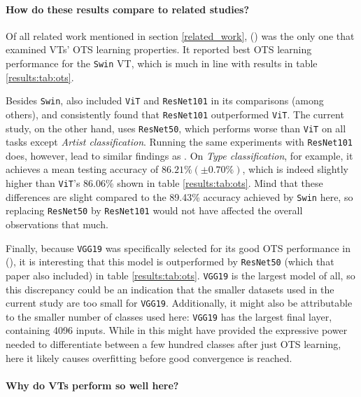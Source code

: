\paragraph{How do these results compare to related studies?}
Of all related work mentioned in section \ref{related_work}, \citeauthor{zhou2021convnets} (\citeyear{zhou2021convnets}) was the only one that examined VTs' OTS learning properties. It reported best OTS learning performance for the \texttt{Swin} VT, which is much in line with results in table \ref{results:tab:ots}.

Besides \texttt{Swin}, \citeauthor{zhou2021convnets} also included \texttt{ViT} and \texttt{ResNet101} in its comparisons (among others), and consistently found that \texttt{ResNet101} outperformed \texttt{ViT}. The current study, on the other hand, uses \texttt{ResNet50}, which performs worse than \texttt{ViT} on all tasks except \textit{Artist classification}. Running the same experiments with \texttt{ResNet101} does, however, lead to similar findings as \citeauthor{zhou2021convnets}. On \textit{Type classification}, for example, it achieves a mean testing accuracy of  $86.21\% (\pm 0.70\%)$, which is indeed slightly higher than \texttt{ViT}'s 86.06\% shown in table \ref{results:tab:ots}. Mind that these differences are slight compared to the 89.43\% accuracy achieved by \texttt{Swin} here, so replacing \texttt{ResNet50} by \texttt{ResNet101} would not have affected the overall observations that much.

Finally, because \texttt{VGG19} was specifically selected for its good OTS performance in \citeauthor{sabatelli2018deep} (\citeyear{sabatelli2018deep}), it is interesting that this model is outperformed by \texttt{ResNet50} (which that paper also included) in table \ref{results:tab:ots}. \texttt{VGG19} is the largest model of all, so this discrepancy could be an indication that the smaller datasets used in the current study are too small for \texttt{VGG19}. Additionally, it might also be attributable to the smaller number of classes used here: \texttt{VGG19} has the largest final layer, containing 4096 inputs. While in \citeauthor{sabatelli2018deep} this might have provided the expressive power needed to differentiate between a few hundred classes after just OTS learning, here it likely causes overfitting before good convergence is reached.

\paragraph{Why do VTs perform so well here?}

